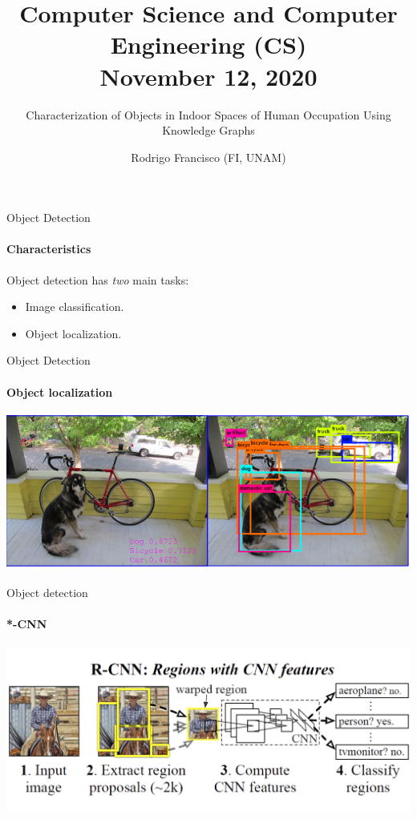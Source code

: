 \documentclass[aspectratio=169]{beamer}
\title{Computer Science and Computer Engineering (CS) \\ 
\small{November 12, 2020}} %
\subtitle{Characterization of Objects in Indoor Spaces of
Human Occupation Using Knowledge Graphs } %
\author{
  Rodrigo Francisco (FI, UNAM)
}
\begin{document}
  \shorthandoff{-}
  \frame[c]{\maketitle}

  \begin{darkframes}
    \begin{frame}{Object Detection}
      \framesubtitle{\alert{Characteristics}}%
      Object detection has \textit{two} main tasks:
      \begin{itemize}
        \item Image classification.
        \item Object localization.
      \end{itemize}
    \end{frame}
    
    \begin{frame}{Object Detection}
      \framesubtitle{\alert{Object localization}}%
      \begin{center}
        \includegraphics[width=\linewidth]{obj-loc}
      \end{center}
    \end{frame}
    
    \begin{frame}{Object detection}
      \framesubtitle{\alert{*-CNN}}%
      \begin{center}
        \includegraphics[width=\linewidth]{rcnn}
      \end{center}
    \end{frame}        


\end{darkframes}
\end{document}
